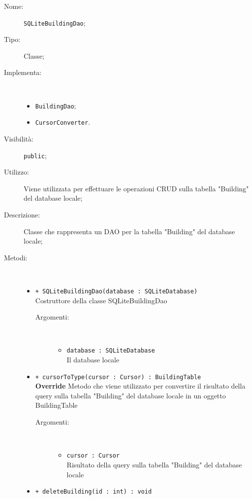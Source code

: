 \documentclass[../DefinizioneDiProdotto.tex]{subfiles}
\begin{document}
\begin{description}
	\item[Nome:] \texttt{SQLiteBuildingDao};
	\item[Tipo:] Classe;
	\item[Implementa:] \
	\begin{itemize}
		\item \texttt{BuildingDao};
		
		\item \texttt{CursorConverter}.
		
	\end{itemize}
	\item[Visibilità:] \texttt{public};
	\item[Utilizzo:] Viene utilizzata per effettuare le operazioni CRUD sulla tabella "Building" del database locale;
	\item[Descrizione:] Classe che rappresenta un DAO per la tabella "Building" del database locale;
	\item[Metodi:] \
	\begin{itemize}
		\item \texttt{+ SQLiteBuildingDao(database : SQLiteDatabase)}\\
		Costruttore della classe SQLiteBuildingDao
		\begin{description}
			\item[Argomenti:] \
			\begin{itemize}
				\item \texttt{database : SQLiteDatabase}\\
				Il database locale\end{itemize}
		\end{description}
		\item \texttt{+ cursorToType(cursor : Cursor) : BuildingTable}\\
		\textbf{Override} Metodo che viene utilizzato per convertire il risultato della query sulla tabella "Building" del database locale in un oggetto BuildingTable
		\begin{description}
			\item[Argomenti:] \
			\begin{itemize}
				\item \texttt{cursor : Cursor}\\
				Risultato della query sulla tabella "Building" del database locale\end{itemize}
		\end{description}
		\item \texttt{+ deleteBuilding(id : int) : void}\\

\end{itemize}
\end{description}
\end{document}

